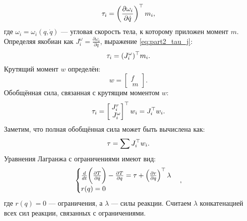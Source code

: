 \begin{equation}
	\label{eq:part2_tau_j}
	\tau_i = \left( \frac{\partial \omega_i}{\partial \dot{{q}}} \right)^\top {m}_i,
\end{equation}
%
где $\omega_i = \omega_i({q}, \dot{{q}})$ --- угловая скорость тела, к которому приложен момент ${m}$.
Определяя якобиан как ${J}^\omega_i = \frac{\partial \omega_i}{\partial \dot{{q}}}$, выражение \eqref{eq:part2_tau_j}:
%
\begin{equation}
\tau_i = ({J}^\omega_i)^\top {m}_i.
\end{equation}
Крутящий момент ${w}$ определён:
\begin{equation}
	{w} = \begin{bmatrix}
		{f} \\\ {m}
	\end{bmatrix}.
\end{equation}
%
Обобщённая сила, связанная с крутящим моментом  ${w}$:
%
\begin{equation}
	\tau_i = \begin{bmatrix}
		{J}^r_i \\\ {J}^\omega_i
	\end{bmatrix}^\top
	{w}_i
	=
	{J}_i^\top {w}_i.
\end{equation}
Заметим, что полная обобщённая сила может быть вычислена как:
%
\begin{equation}
	\tau = \sum {J}_i^\top {w}_i.
\end{equation}
%
Уравнения Лагранжа с ограничениями имеют вид:
%
\begin{equation}
	\begin{cases}
		\frac{d}{dt} \bigg( 
		\frac{\partial T }{\partial \dot{{q}}}
		\bigg) - 
		\frac{\partial T }{\partial {q}} = \tau + \left( \frac{\partial {r}}{\partial {q}} \right)^\top \lambda
		\\
		{r}({q}) = 0
	\end{cases},
\end{equation}
%
%
где ${r}({q}) = 0$ --- ограничения, а $\lambda$ --- силы реакции. Считаем $\lambda$ конкатенацией всех сил реакции, связанных с ограничениями.

